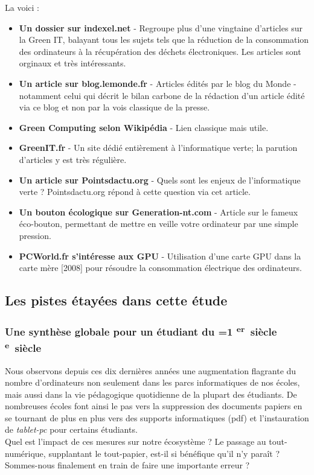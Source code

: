 \documentclass[a4paper,11pt,french]{report}
\newcommand*{\siecle}[1]{%
\ifnum#1=1%
\bsc{\romannumeral #1}\textsuperscript{er}~siècle%
\else%
\bsc{\romannumeral #1}\textsuperscript{e}~siècle%
\fi}
\begin{document}
La voici :
\begin{itemize}
\item \textbf{Un dossier sur indexel.net}\cite{indexel} - Regroupe plus d'une vingtaine d'articles sur la Green IT, balayant tous les sujets tels que la réduction de la consommation des ordinateurs à la récupération des déchets électroniques. Les articles sont orginaux et très intéressants.
\item \textbf{Un article sur blog.lemonde.fr}\cite{bilancarbone} - Articles édités par le blog du Monde - notamment celui qui décrit le bilan carbone de la rédaction d'un article édité via ce blog et non par la vois classique de la presse.
\item \textbf{Green Computing selon Wikipédia}\cite{wiki} - Lien classique mais utile.
\item \textbf{GreenIT.fr}\cite{greenit} - Un site dédié entièrement à l'informatique verte; la parution d'articles y est très régulière.
\item \textbf{Un article sur Pointsdactu.org}\cite{pointactu} - Quels sont les enjeux de l'informatique verte ? Pointsdactu.org répond à cette question via cet article.
\item \textbf{Un bouton écologique sur Generation-nt.com}\cite{ecob} - Article sur le fameux éco-bouton, permettant de mettre en veille votre ordinateur par une simple pression.
\item \textbf{PCWorld.fr s'intéresse aux GPU}\cite{gpu} - Utilisation d'une carte GPU dans la carte mère [2008] pour résoudre la consommation électrique des ordinateurs.
\end{itemize}


\subsection{Les pistes étayées dans cette étude}
\subsubsection{Une synthèse globale pour un étudiant du \siecle{21}}
Nous observons depuis ces dix dernières années une augmentation flagrante du nombre d'ordinateurs non seulement dans les parcs informatiques de nos écoles, mais aussi dans la vie pédagogique quotidienne de la plupart des étudiants. De nombreuses écoles font ainsi le pas vers la suppression des documents papiers en se tournant de plus en plus vers des supports informatiques (\textsf{pdf}) et l'instauration de \textit{tablet-pc} pour certains étudiants.\\
Quel est l'impact de ces mesures sur notre écosystème ? Le passage au tout-numérique, supplantant le tout-papier, est-il si bénéfique qu'il n'y paraît ? Sommes-nous finalement en train de faire une importante erreur ?
\end{document}
